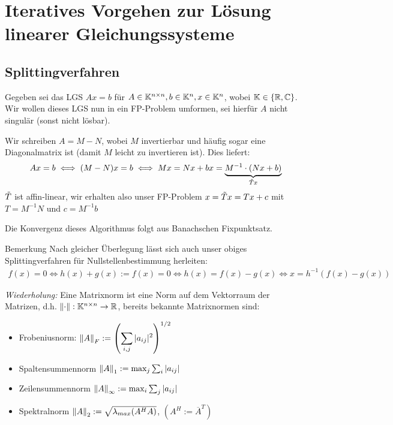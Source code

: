 \section{Iteratives Vorgehen zur Lösung linearer Gleichungssysteme}

\subsection{Splittingverfahren}

Gegeben sei das LGS $Ax=b$ für $A\in\mathbb K^{n\times n}, b\in\mathbb K^n, x\in\mathbb K^n$, 
wobei $\mathbb K\in\{\mathbb R, \mathbb C\}$. Wir wollen dieses LGS nun in ein FP-Problem umformen, 
sei hierfür $A$ nicht singulär (sonst nicht lösbar). 

Wir schreiben $A=M-N$, wobei $M$ invertierbar und häufig sogar eine Diagonalmatrix ist 
(damit $M$ leicht zu invertieren ist). Dies liefert:
%
\begin{align*}
  Ax = b 
  \iff 
  (M-N)x=b 
  \iff 
  Mx=Nx+bx=\underbrace{M^{-1}\cdot(Nx+b)}_{\Tilde{T}x}
\end{align*}
%
$\Tilde{T}$ ist affin-linear, wir erhalten also unser FP-Problem $x=\Tilde{T}x=Tx+c$ 
mit $T=M^{-1}N$ und $c=M^{-1}b$ 


Die Konvergenz dieses Algorithmus folgt aus Banachschen Fixpunktsatz.

\begin{colbox}{Bemerkung}
  Nach gleicher Überlegung lässt sich auch unser obiges Splittingverfahren für Nullstellenbestimmung herleiten:
  \begin{align*}
    f(x)=0
    \iff 
    h(x)+g(x):=f(x) = 0 
    \iff 
    h(x)=f(x)-g(x) 
    \iff
    x=h^{-1}(f(x)-g(x))
    \end{align*}
\end{colbox}

\textit{Wiederholung:} Eine Matrixnorm ist eine Norm auf dem Vektorraum der Matrizen, 
d.h. $\vertn{2}{\cdot}:\K^{n\times n}\rightarrow \R$, bereits bekannte Matrixnormen sind:

\begin{itemize}
  \item Frobeniusnorm: $\vertn{2}{A}_F := \left(\displaystyle \sum_{i,j}|a_{ij}|^2\right)^{1/2}$
  \item Spaltensummennorm $\vertn{2}{A}_1:=\max_j \sum_i |a_{ij}|$
  \item Zeilensummennorm $\vertn{2}{A}_\infty:=\max_i \sum_j |a_{ij}|$
  \item Spektralnorm $\vertn{2}{A}_2:=\sqrt{\lambda_{max}(A^HA)}$, \qquad $(A^H := \overline{A}^T)$
\end{itemize}

